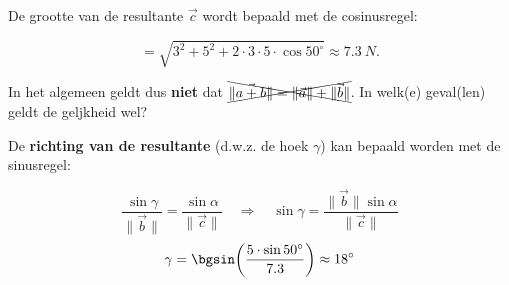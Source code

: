 \documentclass{ximera}
\begin{document}
\begin{example}
\begin{question}
\begin{image}[0.5\textwidth]
    \end{image}
    
De grootte van de resultante \(\vec{c}\) wordt bepaald met de cosinusregel: 

\[
= \sqrt{3^2 + 5^2 + 2 \cdot 3 \cdot 5 \cdot \cos 50^\circ} \approx \SI{7.3}{N}. 
\]

\end{question}

\end{example}

\begin{remark}
In het algemeen geldt dus \textbf{niet} dat  \( \xcancel{ \|\vec{a+b}\| = \|\vec{a}\| + \|\vec{b}\| } \). 
In welk(e) geval(len) geldt de geljkheid wel? 
\end{remark}


De \textbf{richting van de resultante} (d.w.z. de hoek \(\gamma\)) kan bepaald worden met de sinusregel: 


\[
\frac{\sin\gamma}{\|\vec{b}\|} = \frac{\sin\alpha}{\|\vec{c}\|}
\quad\Longrightarrow\quad
\sin\gamma = \frac{\|\vec{b}\|\sin\alpha}{\|\vec{c}\|}
\]
\[
\gamma = \bgsin\!\left(\frac{5\cdot\sin 50^\circ}{7.3}\right) \approx 18^\circ
\]



\end{document}
